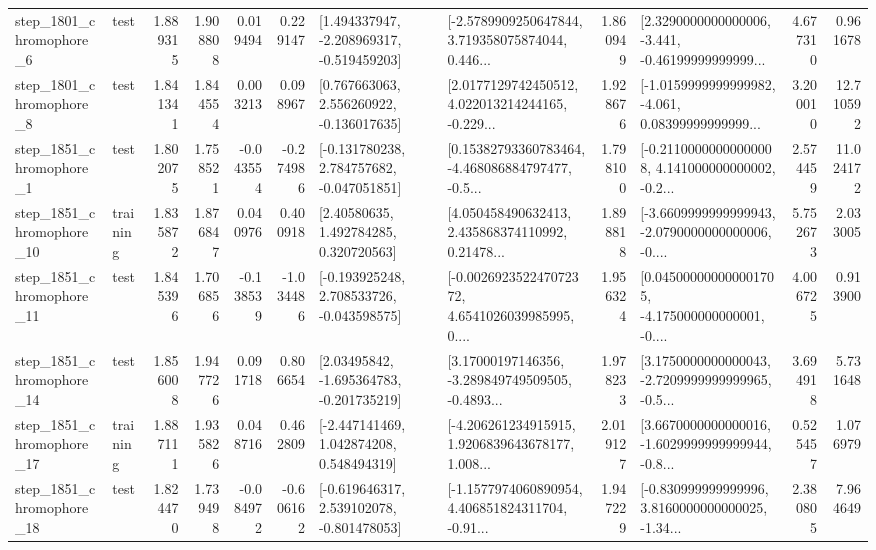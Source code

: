 \begin{tabular}{llrrrrllrlrr}
  step\_1801\_chromophore\_6 &      test &      1.889315 &    1.908808 &      0.019494 &  0.229147 &   [1.494337947, -2.208969317, -0.519459203] &  [-2.5789909250647844, 3.719358075874044, 0.446... &       1.860949 &  [2.3290000000000006, -3.441, -0.46199999999999... &            4.677310 &          0.961678 \\
  step\_1801\_chromophore\_8 &      test &      1.841341 &    1.844554 &      0.003213 &  0.098967 &    [0.767663063, 2.556260922, -0.136017635] &  [2.0177129742450512, 4.022013214244165, -0.229... &       1.928676 &  [-1.0159999999999982, -4.061, 0.08399999999999... &            3.200010 &         12.710592 \\
  step\_1851\_chromophore\_1 &      test &      1.802075 &    1.758521 &     -0.043554 & -0.274986 &   [-0.131780238, 2.784757682, -0.047051851] &  [0.15382793360783464, -4.468086884797477, -0.5... &       1.798100 &  [-0.21100000000000008, 4.141000000000002, -0.2... &            2.574459 &         11.024172 \\
 step\_1851\_chromophore\_10 &  training &      1.835872 &    1.876847 &      0.040976 &  0.400918 &      [2.40580635, 1.492784285, 0.320720563] &  [4.050458490632413, 2.435868374110992, 0.21478... &       1.898818 &  [-3.6609999999999943, -2.0790000000000006, -0.... &            5.752673 &          2.033005 \\
 step\_1851\_chromophore\_11 &      test &      1.845396 &    1.706856 &     -0.138539 & -1.034486 &   [-0.193925248, 2.708533726, -0.043598575] &  [-0.002692352247072372, 4.6541026039985995, 0.... &       1.956324 &  [0.045000000000001705, -4.175000000000001, -0.... &            4.006725 &          0.913900 \\
 step\_1851\_chromophore\_14 &      test &      1.856008 &    1.947726 &      0.091718 &  0.806654 &    [2.03495842, -1.695364783, -0.201735219] &  [3.17000197146356, -3.289849749509505, -0.4893... &       1.978233 &  [3.1750000000000043, -2.7209999999999965, -0.5... &            3.694918 &          5.731648 \\
 step\_1851\_chromophore\_17 &  training &      1.887111 &    1.935826 &      0.048716 &  0.462809 &    [-2.447141469, 1.042874208, 0.548494319] &  [-4.206261234915915, 1.9206839643678177, 1.008... &       2.019127 &  [3.6670000000000016, -1.6029999999999944, -0.8... &            0.525457 &          1.076979 \\
 step\_1851\_chromophore\_18 &      test &      1.824470 &    1.739498 &     -0.084972 & -0.606162 &   [-0.619646317, 2.539102078, -0.801478053] &  [-1.1577974060890954, 4.406851824311704, -0.91... &       1.947229 &  [-0.830999999999996, 3.8160000000000025, -1.34... &            2.380805 &          7.964649 \\

\end{tabular}
